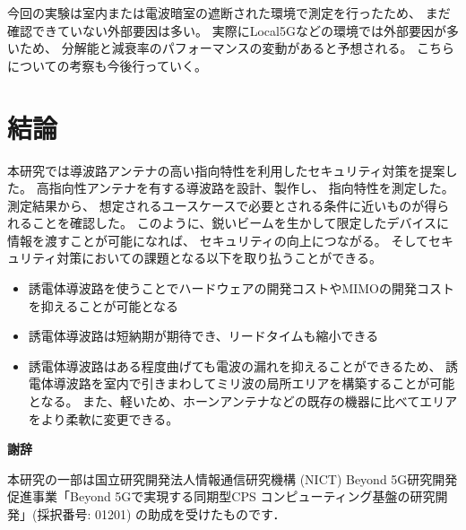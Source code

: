 \documentclass[technicalreport]{ieicej}
\begin{document}
今回の実験は室内または電波暗室の遮断された環境で測定を行ったため、
まだ確認できていない外部要因は多い。
実際にLocal5Gなどの環境では外部要因が多いため、
分解能と減衰率のパフォーマンスの変動があると予想される。
こちらについての考察も今後行っていく。

\section{結論}

本研究では導波路アンテナの高い指向特性を利用したセキュリティ対策を提案した。
高指向性アンテナを有する導波路を設計、製作し、
指向特性を測定した。
測定結果から、
想定されるユースケースで必要とされる条件に近いものが得られることを確認した。
このように、鋭いビームを生かして限定したデバイスに情報を渡すことが可能になれば、
セキュリティの向上につながる。
そしてセキュリティ対策においての課題となる以下を取り払うことができる。

\begin{itemize}
  \item 誘電体導波路を使うことでハードウェアの開発コストやMIMOの開発コストを抑えることが可能となる
  \item 誘電体導波路は短納期が期待でき、リードタイムも縮小できる
  \item 誘電体導波路はある程度曲げても電波の漏れを抑えることができるため、
  誘電体導波路を室内で引きまわしてミリ波の局所エリアを構築することが可能となる。
  また、軽いため、ホーンアンテナなどの既存の機器に比べてエリアをより柔軟に変更できる。
\end{itemize}

\begin{center}
  \Large \textbf{謝辞}
\end{center}

本研究の一部は国立研究開発法人情報通信研究機構 (NICT) 
Beyond 5G研究開発促進事業「Beyond 5Gで実現する同期型CPS
コンピューティング基盤の研究開発」(採択番号: 01201) の助成を受けたものです．

%
%

\end{document}

